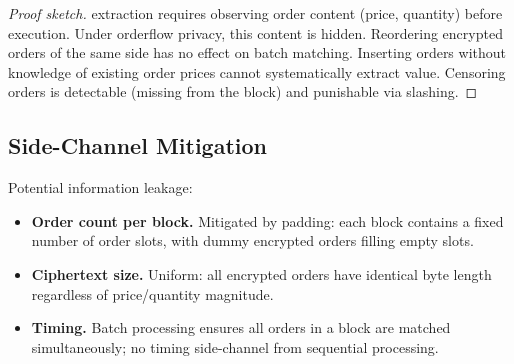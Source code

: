 \begin{proof}[Proof sketch]
\MEV{} extraction requires observing order content (price, quantity) before execution. Under orderflow privacy, this content is hidden. Reordering encrypted orders of the same side has no effect on batch matching. Inserting orders without knowledge of existing order prices cannot systematically extract value. Censoring orders is detectable (missing from the block) and punishable via slashing.
\end{proof}

\subsection{Side-Channel Mitigation}

Potential information leakage:

\begin{itemize}
    \item \textbf{Order count per block.} Mitigated by padding: each block contains a fixed number of order slots, with dummy encrypted orders filling empty slots.
    \item \textbf{Ciphertext size.} Uniform: all encrypted orders have identical byte length regardless of price/quantity magnitude.
    \item \textbf{Timing.} Batch processing ensures all orders in a block are matched simultaneously; no timing side-channel from sequential processing.
\end{itemize}

